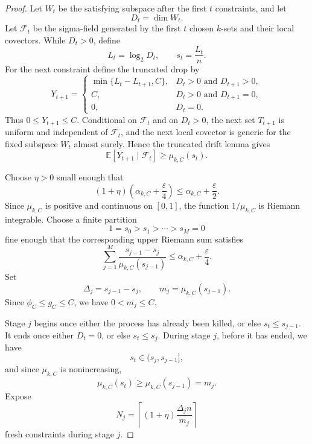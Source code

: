 \documentclass[11pt]{article}
\begin{document}
	\begin{proof}
		Let \(W_t\) be the satisfying subspace after the first \(t\) constraints,
		and let
		\[
		D_t=\dim W_t.
		\]
		Let \(\mathcal F_t\) be the sigma-field generated by the first \(t\)
		chosen \(k\)-sets and their local covectors. While \(D_t>0\), define
		\[
		L_t=\log_2D_t,
		\qquad
		s_t=\frac{L_t}{n}.
		\]
		For the next constraint define the truncated drop by
		\[
		Y_{t+1}
		=
		\begin{cases}
		\min\{L_t-L_{t+1},C\}, & D_t>0\text{ and }D_{t+1}>0,\\[2mm]
		C, & D_t>0\text{ and }D_{t+1}=0,\\[2mm]
		0, & D_t=0.
		\end{cases}
		\]
		Thus \(0\le Y_{t+1}\le C\). Conditional on \(\mathcal F_t\) and on
		\(D_t>0\), the next set \(T_{t+1}\) is uniform and independent of
		\(\mathcal F_t\), and the next local covector is generic for the fixed
		subspace \(W_t\) almost surely. Hence the truncated drift lemma gives
		\[
		\mathbb E[Y_{t+1}\mid\mathcal F_t]
		\ge
		\mu_{k,C}(s_t).
		\]
		
		Choose \(\eta>0\) small enough that
		\[
		(1+\eta)\left(\alpha_{k,C}+\frac{\varepsilon}{4}\right)
		\le
		\alpha_{k,C}+\frac{\varepsilon}{2}.
		\]
		Since \(\mu_{k,C}\) is positive and continuous on \([0,1]\), the function
		\(1/\mu_{k,C}\) is Riemann integrable. Choose a finite partition
		\[
		1=s_0>s_1>\cdots>s_M=0
		\]
		fine enough that the corresponding upper Riemann sum satisfies
		\[
		\sum_{j=1}^M
		\frac{s_{j-1}-s_j}{\mu_{k,C}(s_{j-1})}
		\le
		\alpha_{k,C}+\frac{\varepsilon}{4}.
		\]
		Set
		\[
		\Delta_j=s_{j-1}-s_j,
		\qquad
		m_j=\mu_{k,C}(s_{j-1}).
		\]
		Since \(\phi_C\le g_C\le C\), we have \(0<m_j\le C\).
		
		Stage \(j\) begins once either the process has already been killed, or else
		\(s_t\le s_{j-1}\). It ends once either \(D_t=0\), or else
		\(s_t\le s_j\). During stage \(j\), before it has ended, we have
		\[
		s_t\in(s_j,s_{j-1}],
		\]
		and since \(\mu_{k,C}\) is nonincreasing,
		\[
		\mu_{k,C}(s_t)\ge \mu_{k,C}(s_{j-1})=m_j.
		\]
		Expose
		\[
		N_j=
		\left\lceil
		(1+\eta)\frac{\Delta_j n}{m_j}
		\right\rceil
		\]
		fresh constraints during stage \(j\).
		

\end{proof}
\end{document}
